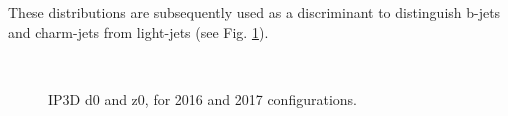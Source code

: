             These distributions are subsequently used as a discriminant to distinguish b-jets and charm-jets from light-jets
                (see Fig. \ref{fig:ip3dsig})\cite{thesis_giacinto}. %

            \begin{figure}
                \\
                \caption{
                    IP3D d0 and z0, for 2016 and 2017 configurations\cite{btagging_optimisation}.
                }
                \label{fig:ip3dsig}
            \end{figure}


        \FloatBarrier


